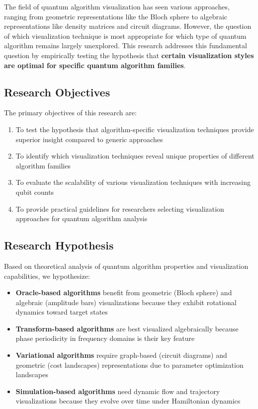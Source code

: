 \documentclass[12pt,a4paper]{article}
\begin{document}
The field of quantum algorithm visualization has seen various approaches, ranging from geometric representations like the Bloch sphere to algebraic representations like density matrices and circuit diagrams. However, the question of which visualization technique is most appropriate for which type of quantum algorithm remains largely unexplored. This research addresses this fundamental question by empirically testing the hypothesis that \textbf{certain visualization styles are optimal for specific quantum algorithm families}.

\subsection{Research Objectives}

The primary objectives of this research are:

\begin{enumerate}
	\item To test the hypothesis that algorithm-specific visualization techniques provide superior insight compared to generic approaches
	\item To identify which visualization techniques reveal unique properties of different algorithm families
	\item To evaluate the scalability of various visualization techniques with increasing qubit counts
	\item To provide practical guidelines for researchers selecting visualization approaches for quantum algorithm analysis
\end{enumerate}

\subsection{Research Hypothesis}

Based on theoretical analysis of quantum algorithm properties and visualization capabilities, we hypothesize:

\begin{itemize}
	\item \textbf{Oracle-based algorithms} benefit from geometric (Bloch sphere) and algebraic (amplitude bars) visualizations because they exhibit rotational dynamics toward target states
	\item \textbf{Transform-based algorithms} are best visualized algebraically because phase periodicity in frequency domains is their key feature
	\item \textbf{Variational algorithms} require graph-based (circuit diagrams) and geometric (cost landscapes) representations due to parameter optimization landscapes
	\item \textbf{Simulation-based algorithms} need dynamic flow and trajectory visualizations because they evolve over time under Hamiltonian dynamics
\end{itemize}
\end{document}
